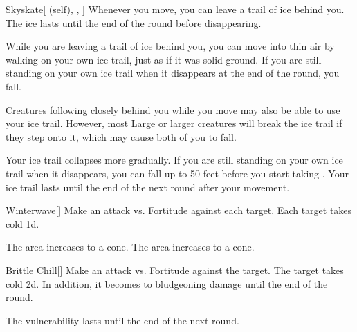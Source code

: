 \lowercase{\hypertarget{spell:Skyskate}{}}\label{spell:Skyskate}
\begin{attuneability}[Rank 3]{\hypertarget{spell:Skyskate}{Skyskate}}[ (self), , ]
Whenever you move, you can leave a trail of ice behind you.
The ice lasts until the end of the round before disappearing.

While you are leaving a trail of ice behind you, you can move into thin air by walking on your own ice trail, just as if it was solid ground.
If you are still standing on your own ice trail when it disappears at the end of the round, you fall.

Creatures following closely behind you while you move may also be able to use your ice trail.
However, most Large or larger creatures will break the ice trail if they step onto it, which may cause both of you to fall.

\rankline
{} Your ice trail collapses more gradually.  If you are still standing on your own ice trail when it disappears, you can fall up to 50 feet before you start taking .
 Your ice trail lasts until the end of the next round after your movement.
\end{attuneability}
\vspace{0.25em}



\lowercase{\hypertarget{spell:Winterwave}{}}\label{spell:Winterwave}
\begin{freeability}[Rank 3]{\hypertarget{spell:Winterwave}{Winterwave}}[]
Make an attack vs. Fortitude against each target.
\hit Each target takes cold  \minus1d.

\rankline
{} The area increases to a \areahuge cone.
 The area increases to a \areaext cone.
\end{freeability}
\vspace{0.25em}



\lowercase{\hypertarget{spell:Brittle Chill}{}}\label{spell:Brittle Chill}
\begin{freeability}[Rank 4]{\hypertarget{spell:Brittle Chill}{Brittle Chill}}[]
Make an attack vs. Fortitude against the target.
\hit The target takes cold  \minus2d.
In addition, it becomes  to bludgeoning damage until the end of the round.

\rankline
{} The vulnerability lasts until the end of the next round.
\end{freeability}
\vspace{0.25em}



